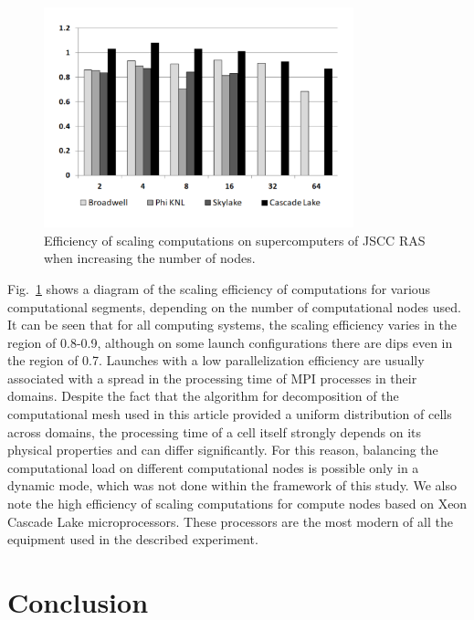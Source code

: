 \documentclass[
11pt,%
tightenlines,%
twoside,%
onecolumn,%
nofloats,%
nobibnotes,%
nofootinbib,%
superscriptaddress,%
noshowpacs,%
centertags]%
{revtex4}
\begin{document}
\begin{figure}[h]
\includegraphics[width=0.8\textwidth]{pics/scaling.pdf}
\caption{Efficiency of scaling computations on supercomputers of JSCC RAS when increasing the number of nodes.}\label{fig:speedup}
\end{figure}

Fig.~\ref{fig:speedup} shows a diagram of the scaling efficiency of computations for various computational segments, depending on the number of computational nodes used.
It can be seen that for all computing systems, the scaling efficiency varies in the region of 0.8-0.9, although on some launch configurations there are dips even in the region of 0.7.
Launches with a low parallelization efficiency are usually associated with a spread in the processing time of MPI processes in their domains.
Despite the fact that the algorithm for decomposition of the computational mesh used in this article provided a uniform distribution of cells across domains, the processing time of a cell itself strongly depends on its physical properties and can differ significantly.
For this reason, balancing the computational load on different computational nodes is possible only in a dynamic mode, which was not done within the framework of this study.
We also note the high efficiency of scaling computations for compute nodes based on Xeon Cascade Lake microprocessors.
These processors are the most modern of all the equipment used in the described experiment.

\section{Conclusion}
\end{document}
